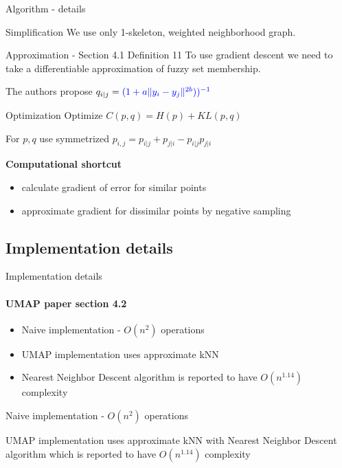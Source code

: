 \documentclass[unknownkeysallowed]{beamer}
\begin{document}
\begin{frame}{Algorithm - details}

    \begin{block}{Simplification}
    We use only 1-skeleton, weighted neighborhood graph.
    \end{block}

    \begin{block}{Approximation - Section 4.1 Definition 11}
    To use gradient descent we need to take a differentiable approximation of fuzzy set membership. 

    The authors propose $q_{i|j} = \textcolor{blue}{(1 + a\|y_i - y_j\|^{2b}))^{-1}}$
    \end{block}

    \begin{block}{Optimization}
    Optimize $C(p, q) = H(p) + KL(p, q)$

    For $p, q$ use symmetrized $p_{i,j} = p_{i|j} + p_{j|i} - p_{i|j} p_{j|i}$

    \textbf{Computational shortcut}
    \begin{itemize}
        \item calculate gradient of error for similar points
        \item approximate gradient for dissimilar points by negative sampling
    \end{itemize}

    \end{block}


\end{frame}

\subsection{Implementation details}
\begin{frame}{Implementation details}
\framesubtitle{UMAP paper section 4.2}

    \begin{itemize}
        \item Naive implementation - $O(n^2)$ operations
        \item UMAP implementation uses approximate kNN 	
        \item Nearest Neighbor Descent algorithm is reported to have $O(n^{1.14})$ complexity
    \end{itemize}
    \begin{flushleft}
    Naive implementation - $O(n^2)$ operations

    UMAP implementation uses approximate kNN with Nearest Neighbor Descent algorithm which is reported to have $O(n^{1.14})$ complexity
    \end{flushleft}

\end{frame}
\end{document}
